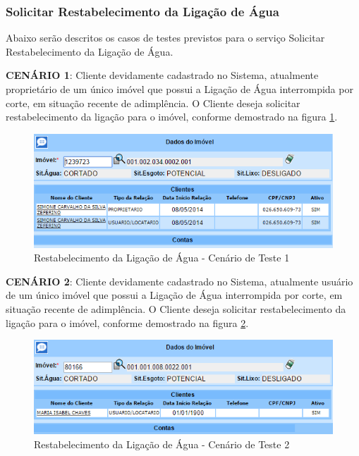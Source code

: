 \subsubsection{Solicitar Restabelecimento da Ligação de Água}
Abaixo serão descritos os casos de testes previstos para o serviço Solicitar Restabelecimento da Ligação de Água.
\begin{flushleft}
	\begin{description}
		\item \textbf{CENÁRIO 1}: Cliente devidamente cadastrado no Sistema, atualmente proprietário de um único imóvel que possui a Ligação de Água interrompida por corte, em situação recente de adimplência. O Cliente deseja solicitar restabelecimento da ligação para o imóvel, conforme demostrado na figura \ref{figura:restabelecimentoLigacaoCenario1}.
		\begin{figure}[H]
			\centering
			\caption{Restabelecimento da Ligação de Água - Cenário de Teste 1}
			\label{figura:restabelecimentoLigacaoCenario1}
			\includegraphics{figuras/cenarios/restabelecimento/cenario_1.PNG}
		\end{figure}
	\end{description}
	
	\begin{description}
		\item \textbf{CENÁRIO 2}: Cliente devidamente cadastrado no Sistema, atualmente usuário de um único imóvel que possui a Ligação de Água interrompida por corte, em situação recente de adimplência. O Cliente deseja solicitar restabelecimento da ligação para o imóvel, conforme demostrado na figura \ref{figura:restabelecimentoLigacaoCenario2}.
		\begin{figure}[H]
			\centering
			\caption{Restabelecimento da Ligação de Água - Cenário de Teste 2}
			\label{figura:restabelecimentoLigacaoCenario2}
			\includegraphics{figuras/cenarios/restabelecimento/cenario_2.PNG}
			\legend {\fontsize{10}{12}\selectfont {Fonte: Autoria Própria}.}	
		\end{figure}
	\end{description}
	

\end{flushleft}
